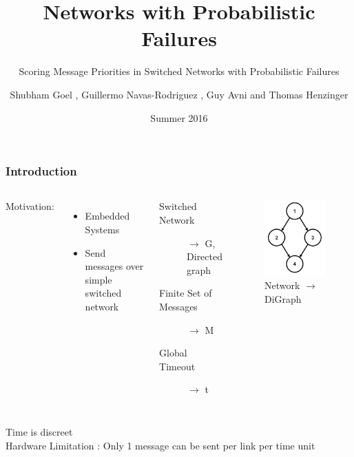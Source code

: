 \documentclass{beamer}
\begin{document}
\title[Probabilistic Networks]{Networks with Probabilistic Failures}
\subtitle[Probabilistically Scoring Message Priorities]{Scoring Message Priorities in Switched Networks with Probabilistic Failures}
\author[Shubham Goel]{Shubham Goel , Guillermo Navas-Rodriguez , Guy Avni  and Thomas Henzinger }
\date[Summer 2016]{Summer 2016}

\begin{frame}[plain]
  \titlepage
\end{frame}

\begin{frame}
\frametitle{Introduction}
	\begin{columns}
	Motivation:\\
	\begin{itemize}
	\item Embedded Systems
	\item Send messages over simple switched network\\[2ex]
	\end{itemize}
	\pause
	\begin{description}
	\item[Switched Network] $\to$ G, Directed graph
	\item[Finite Set of Messages] $\to$ M
	\item[Global Timeout] $\to$ t
	\end{description}
	\begin{figure}
	\includegraphics[scale=0.3]{media/digraph2.jpg}
	\caption{Network $\to$ DiGraph}
	\end{figure}
	\end{columns}
	\pause
	\vspace*{20pt}
	Time is discreet\\
	Hardware Limitation : Only 1 message can be sent per link per time unit
\end{frame}
\end{document}
